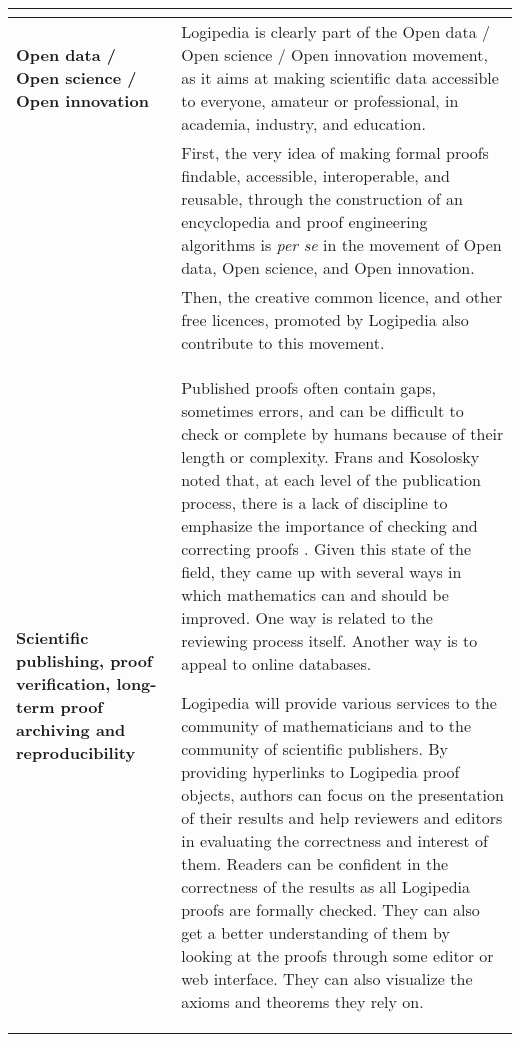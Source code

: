 \begin{longtable}{|p{}|p{}|}
\begin{compactitem}
\end{compactitem}
\\
\hline
{\bf Open data / Open science / Open innovation}
&
Logipedia is clearly part of the Open data / Open science / Open
innovation movement, as it aims at making scientific data accessible
to everyone, amateur or professional, in academia, industry, and
education.\\
&
\hspace{0.4cm}
First, the very idea of making formal proofs findable, accessible,
interoperable, and reusable, through the construction of an
encyclopedia and proof engineering algorithms is {\em per se} in the
movement of Open data, Open science, and Open innovation.\\
&
\hspace{0.4cm}
Then, the creative common licence, and other free licences, promoted by 
Logipedia also contribute to this movement.
\\
\hline
{\bf Scientific publishing, proof verification, long-term proof archiving and reproducibility}
&
Published proofs often contain gaps, sometimes errors, and can be difficult
to check or complete by humans because of their length or
complexity. Frans and Kosolosky noted that, at each level of the
publication process, there is a lack of discipline to emphasize the
importance of checking and correcting proofs
\cite{frans14theoria}. Given this state of the field, they came up
with several ways in which mathematics can and should be improved.
One way is related to the reviewing process itself. Another
way is to appeal to online databases.

\hspace{0.4cm}
Logipedia will provide various services to the community of
mathematicians and to the community of scientific publishers. By
providing hyperlinks to Logipedia proof objects, authors can focus on
the presentation of their results and help reviewers and editors in
evaluating the correctness and interest of them. Readers can be
confident in the correctness of the results as all Logipedia proofs
are formally checked. They can also get a better understanding of them
by looking at the proofs through some editor or web interface. They
can also visualize the axioms and theorems they rely on.


\end{longtable}

